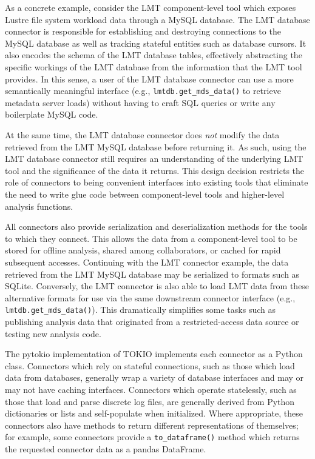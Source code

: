 As a concrete example, consider the LMT component-level tool which exposes Lustre file system workload data through a MySQL database.
The LMT database connector is responsible for establishing and destroying connections to the MySQL database as well as tracking stateful entities such as database cursors.
It also encodes the schema of the LMT database tables, effectively abstracting the specific workings of the LMT database from the information that the LMT tool provides.
In this sense, a user of the LMT database connector can use a more semantically meaningful interface (e.g., \texttt{lmtdb.get\_mds\_data()} to retrieve metadata server loads) without having to craft SQL queries or write any boilerplate MySQL code.

At the same time, the LMT database connector does \emph{not} modify the data retrieved from the LMT MySQL database before returning it.
As such, using the LMT database connector still requires an understanding of the underlying LMT tool and the significance of the data it returns.
This design decision restricts the role of connectors to being convenient interfaces into existing tools that eliminate the need to write glue code between component-level tools and higher-level analysis functions.

All connectors also provide serialization and deserialization methods for the tools to which they connect.
This allows the data from a component-level tool to be stored for offline analysis, shared among collaborators, or cached for rapid subsequent accesses.
Continuing with the LMT connector example, the data retrieved from the LMT MySQL database may be serialized to formats such as SQLite.
Conversely, the LMT connector is also able to load LMT data from these alternative formats for use via the same downstream connector interface (e.g., \texttt{lmtdb.get\_mds\_data()}).
This dramatically simplifies some tasks such as publishing analysis data that originated from a restricted-access data source or testing new analysis code.

The pytokio implementation of TOKIO implements each connector as a Python class.
Connectors which rely on stateful connections, such as those which load data from databases, generally wrap a variety of database interfaces and may or may not have caching interfaces.
Connectors which operate statelessly, such as those that load and parse discrete log files, are generally derived from Python dictionaries or lists and self-populate when initialized.
Where appropriate, these connectors also have methods to return different representations of themselves; for example, some connectors provide a \texttt{to\_dataframe()} method which returns the requested connector data as a pandas DataFrame.

